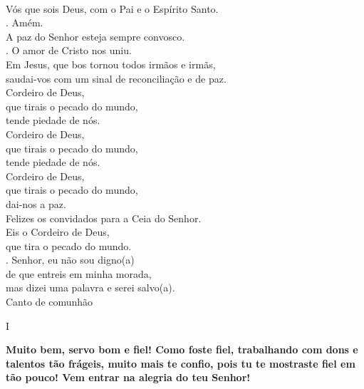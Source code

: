 \documentclass{book}
\begin{document}
\begin{flushleft}
    \vspace{.2cm} \\
    Vós que sois Deus, com o Pai e o Espírito Santo.
    \vspace{.2cm} \\
    {\color{VioletRed2} \Rbar.} Amém.
    \vspace{.2cm} \\
    A paz do Senhor esteja sempre convosco.
    \vspace{.2cm} \\
    {\color{VioletRed2} \Rbar.} O amor de Cristo nos uniu.
    \vspace{.2cm} \\
    Em Jesus, que bos tornou todos irmãos e irmãs, \\
    saudai-vos com um sinal de reconciliação e de paz.
    \vspace{.2cm} \\
    Cordeiro de Deus, \\
    que tirais o pecado do mundo, \\
    tende piedade de nós. \\
    Cordeiro de Deus, \\
    que tirais o pecado do mundo, \\
    tende piedade de nós. \\
    Cordeiro de Deus, \\
    que tirais o pecado do mundo, \\
    dai-nos a paz.
    \vspace{.2cm} \\
    Felizes os convidados para a Ceia do Senhor.
    \vspace{.2cm} \\
    Eis o Cordeiro de Deus, \\
    que tira o pecado do mundo.
    \vspace{.2cm} \\
    {\color{VioletRed2} \Rbar.} Senhor, eu não sou digno{\color{VioletRed2}(}a{\color{VioletRed2})} \\
    de que entreis em minha morada, \\
    mas dizei uma palavra e serei salvo{\color{VioletRed2}(}a{\color{VioletRed2})}.
    \vspace{.2cm} \\
    \textcolor{VioletRed2}{Canto de comunhão}
    \begin{center}
        I
    \end{center}
    \textbf{Muito bem, servo bom e fiel! Como foste fiel, trabalhando com dons e talentos tão frágeis, muito mais te confio, pois tu te mostraste fiel em tão pouco! Vem entrar na alegria do teu Senhor!}

\end{flushleft}
\end{document}
